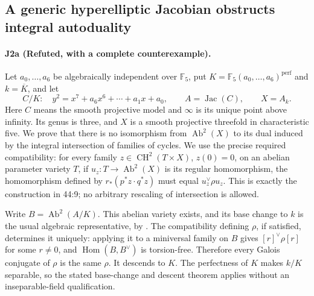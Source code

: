 \subsection{A generic hyperelliptic Jacobian obstructs integral autoduality}
\paragraph{J2a (Refuted, with a complete counterexample).}
Let $a_0,\ldots,a_6$ be algebraically independent over $\mathbb F_5$,
put $K=\mathbb F_5(a_0,\ldots,a_6)^{\mathrm{perf}}$ and
$k=\overline K$, and let
\[
 C/K:\quad y^2=x^7+a_6x^6+\cdots+a_1x+a_0,
 \qquad A=\operatorname{Jac}(C),\qquad X=A_k.
\]
Here $C$ means the smooth projective model and $\infty$ is its
unique point above infinity.  Its genus is three, and $X$ is a
smooth projective threefold in characteristic five.  We prove
that there is no isomorphism from $\operatorname{Ab}^2(X)$ to its
dual induced by the integral intersection of families of cycles.
We use the precise required compatibility: for every family
$z\in\operatorname{CH}^2(T\times X)$, $z(0)=0$, on an abelian
parameter variety $T$, if $u_z:T\to\operatorname{Ab}^2(X)$ is its
regular homomorphism, the homomorphism defined by
$r_*(p^*z\cdot q^*z)$ must equal $u_z^\vee\rho u_z$.
This is exactly the construction in 44:9; no arbitrary rescaling
of intersection is allowed.

Write $B=\operatorname{Ab}^2(A/K)$.  This abelian variety exists,
and its base change to $k$ is the usual algebraic representative,
by \cite[Theorem 5.10, pp.~25--26; Theorem 6.1, pp.~26--27]{DGJ_ACMVFunctor}.
The compatibility defining $\rho$, if satisfied, determines it
uniquely: applying it to a miniversal family on $B$ gives
$[r]^\vee\rho[r]$ for some $r\ne0$, and $\operatorname{Hom}(B,B^\vee)$
is torsion-free.  Therefore every Galois conjugate of $\rho$ is the
same $\rho$.  It descends to $K$.  The perfectness of $K$ makes
$k/K$ separable, so the stated base-change and descent theorem
applies without an inseparable-field qualification.

